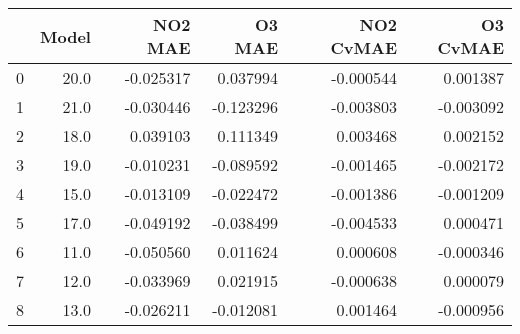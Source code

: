 \begin{tabular}{lrrrrr}
\toprule
{} &  Model &   NO2 MAE &    O3 MAE &  NO2 CvMAE &  O3 CvMAE \\
\midrule
0 &   20.0 & -0.025317 &  0.037994 &  -0.000544 &  0.001387 \\
1 &   21.0 & -0.030446 & -0.123296 &  -0.003803 & -0.003092 \\
2 &   18.0 &  0.039103 &  0.111349 &   0.003468 &  0.002152 \\
3 &   19.0 & -0.010231 & -0.089592 &  -0.001465 & -0.002172 \\
4 &   15.0 & -0.013109 & -0.022472 &  -0.001386 & -0.001209 \\
5 &   17.0 & -0.049192 & -0.038499 &  -0.004533 &  0.000471 \\
6 &   11.0 & -0.050560 &  0.011624 &   0.000608 & -0.000346 \\
7 &   12.0 & -0.033969 &  0.021915 &  -0.000638 &  0.000079 \\
8 &   13.0 & -0.026211 & -0.012081 &   0.001464 & -0.000956 \\
\bottomrule
\end{tabular}
